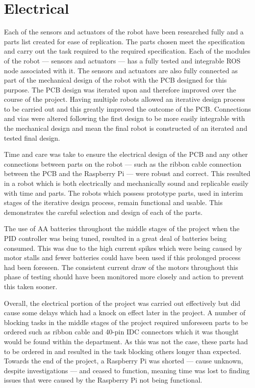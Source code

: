 \section{Electrical}\label{eval/elec}
Each of the sensors and actuators of the robot have been researched fully and a 
parts list created for ease of replication. The parts chosen meet the 
specification and carry out the task required to the required specification. 
Each of the modules of the robot --- sensors and actuators --- has a fully 
tested and integrable ROS node associated with it. The sensors and actuators are 
also fully connected as part of the mechanical design of the robot with the PCB 
designed for this purpose. The PCB design was iterated upon and therefore 
improved over the course of the project. Having multiple robots allowed an 
iterative design process to be carried out and this greatly improved the outcome 
of the PCB. Connections and vias were altered following the first design to be 
more easily integrable with the mechanical design and mean the final robot is 
constructed of an iterated and tested final design. 

Time and care was take to ensure the electrical design of the PCB and any other 
connections between parts on the robot --- such as the ribbon cable connection 
between the PCB and the Raspberry Pi --- were robust and correct. This resulted 
in a robot which is both electrically and mechanically sound and replicable 
easily with time and parts. The robots which possess prototype parts, used in 
interim stages of the iterative design process, remain functional and usable. 
This demonstrates the careful selection and design of each of the parts. 

The use of AA batteries throughout the middle stages of the project when the PID 
controller was being tuned, resulted in a great deal of batteries being consumed. 
This was due to the high current spikes which were being caused by motor stalls and 
fewer batteries could have been used if this prolonged process had been foreseen. The 
consistent current draw of the motors throughout this phase of testing should have 
been monitored more closely and action to prevent this taken sooner.   

Overall, the electrical portion of the project was carried out effectively but did 
cause some delays which had a knock on effect later in the project. A number of 
blocking tasks in the middle stages of the project required unforeseen parts to be 
ordered such as ribbon cable and 40-pin IDC connectors which it was thought would be 
found within the department. As this was not the case, these parts had to be ordered 
in and resulted in the task blocking others longer than expected. Towards the end of 
the project, a Raspberry Pi was shorted --- cause unknown, despite investigations --- 
and ceased to function, meaning time was lost to finding issues that were caused by 
the Raspberry Pi not being functional.    
 
